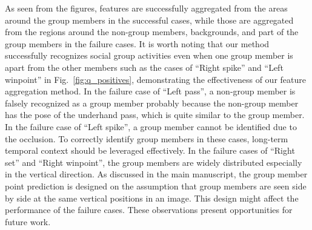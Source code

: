 \documentclass[runningheads]{llncs}
\begin{document}
As seen from the figures, features are successfully aggregated from the areas around the group members in the successful cases, while those are aggregated from the regions around the non-group members, backgrounds, and part of the group members in the failure cases. It is worth noting that our method successfully recognizes social group activities even when one group member is apart from the other members such as the cases of ``Right spike'' and ``Left winpoint'' in Fig.~\ref{fig:q_positives}, demonstrating the effectiveness of our feature aggregation method. In the failure case of ``Left pass'', a non-group member is falsely recognized as a group member probably because the non-group member has the pose of the underhand pass, which is quite similar to the group member. In the failure case of ``Left spike'', a group member cannot be identified due to the occlusion. To correctly identify group members in these cases, long-term temporal context should be leveraged effectively. In the failure cases of ``Right set'' and ``Right winpoint'', the group members are widely distributed especially in the vertical direction. As discussed in the main manuscript, the group member point prediction is designed on the assumption that group members are seen side by side at the same vertical positions in an image. This design might affect the performance of the failure cases. These observations present opportunities for future work.
\end{document}
